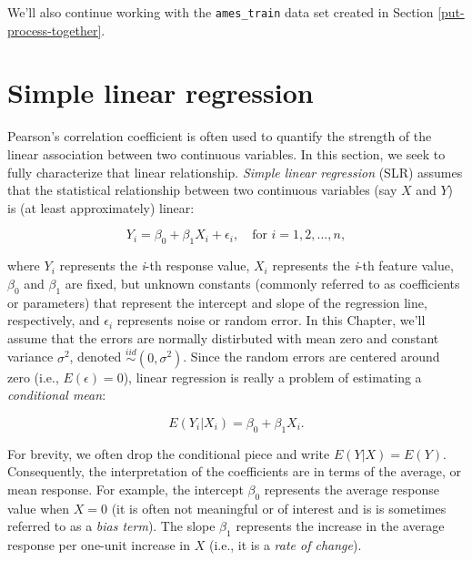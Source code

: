 \documentclass[]{krantz}
\begin{document}
We'll also continue working with the \texttt{ames\_train} data set created in Section \ref{put-process-together}.

\hypertarget{simple-linear-regression}{%
\section{Simple linear regression}\label{simple-linear-regression}}

Pearson's correlation coefficient is often used to quantify the strength of the linear association between two continuous variables. In this section, we seek to fully characterize that linear relationship. \emph{Simple linear regression} (SLR) assumes that the statistical relationship between two continuous variables (say \(X\) and \(Y\)) is (at least approximately) linear:

\begin{equation}
\label{eq:lm}
  Y_i = \beta_0 + \beta_1 X_i + \epsilon_i, \quad \text{for } i = 1, 2, \dots, n,
\end{equation}

where \(Y_i\) represents the \emph{i}-th response value, \(X_i\) represents the \emph{i}-th feature value, \(\beta_0\) and \(\beta_1\) are fixed, but unknown constants (commonly referred to as coefficients or parameters) that represent the intercept and slope of the regression line, respectively, and \(\epsilon_i\) represents noise or random error. In this Chapter, we'll assume that the errors are normally distirbuted with mean zero and constant variance \(\sigma^2\), denoted \(\stackrel{iid}{\sim} \left(0, \sigma^2\right)\). Since the random errors are centered around zero (i.e., \(E\left(\epsilon\right) = 0\)), linear regression is really a problem of estimating a \emph{conditional mean}:

\begin{equation}
  E\left(Y_i | X_i\right) = \beta_0 + \beta_1 X_i.
\end{equation}

For brevity, we often drop the conditional piece and write \(E\left(Y | X\right) = E\left(Y\right)\). Consequently, the interpretation of the coefficients are in terms of the average, or mean response. For example, the intercept \(\beta_0\) represents the average response value when \(X = 0\) (it is often not meaningful or of interest and is is sometimes referred to as a \emph{bias term}). The slope \(\beta_1\) represents the increase in the average response per one-unit increase in \(X\) (i.e., it is a \emph{rate of change}).
\end{document}
